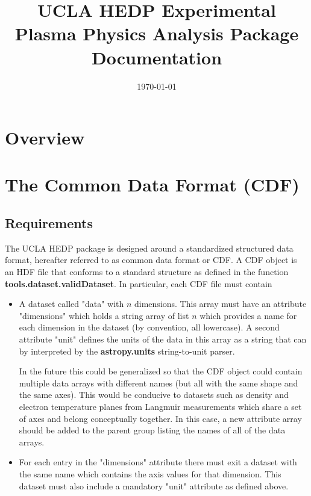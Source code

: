 \documentclass[12pt]{article}
\title{UCLA HEDP Experimental Plasma Physics Analysis Package Documentation}
\date{\today}
\newcommand{\loc}[1]{{\bf \fontfamily{pcr}\selectfont #1}}
\newcommand{\todo}[1]{ \begin{tcolorbox} \centering  #1 \end{tcolorbox}}
\begin{document}
\maketitle

\newpage

\tableofcontents

\newpage

\section{Overview}

\section{The Common Data Format (CDF)}

\subsection{Requirements}

The UCLA HEDP package is designed around a standardized structured data format, hereafter referred to as common data format or CDF. A CDF object is an HDF file that conforms to a standard structure as defined in the function \loc{tools.dataset.validDataset}. In particular, each CDF file must contain

\begin{itemize}

\item A dataset called "data" with $n$ dimensions. This array must have an attribute "dimensions" which holds a string array of list $n$ which provides a name for each dimension in the dataset (by convention, all lowercase). A second attribute "unit" defines the units of the data in this array as a string that can by interpreted by the \loc{astropy.units} string-to-unit parser. 

\todo{In the future this could be generalized so that the CDF object could contain multiple data arrays with different names (but all with the same shape and the same axes). This would be conducive to datasets such as density and electron temperature planes from Langmuir measurements which share a set of axes and belong conceptually together. In this case, a new attribute array should be added to the parent group listing the names of all of the data arrays. }

\item For each entry in the "dimensions" attribute there must exit a dataset with the same name which contains the axis values for that dimension. This dataset must also include a mandatory "unit" attribute as defined above.

\end{itemize}
\end{document}
